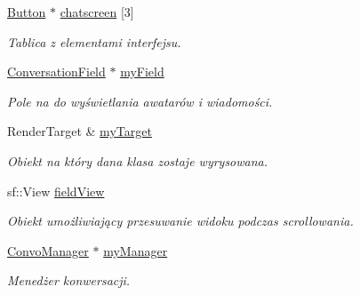 \begin{DoxyCompactItemize}
\item 
\mbox{\label{class_chat_screen_a4a7f9298b854b57eb87b70297a92a90b}} 
\mbox{\hyperlink{class_button}{Button}} $\ast$ \mbox{\hyperlink{class_chat_screen_a4a7f9298b854b57eb87b70297a92a90b}{chatscreen}} \mbox{[}3\mbox{]}
\begin{DoxyCompactList}\small\item\em Tablica z elementami interfejsu. \end{DoxyCompactList}\item 
\mbox{\label{class_chat_screen_ac2cffb6f9f504f93caf42bb356797e58}} 
\mbox{\hyperlink{class_conversation_field}{Conversation\+Field}} $\ast$ \mbox{\hyperlink{class_chat_screen_ac2cffb6f9f504f93caf42bb356797e58}{my\+Field}}
\begin{DoxyCompactList}\small\item\em Pole na do wyświetlania awatarów i wiadomości. \end{DoxyCompactList}\item 
\mbox{\label{class_chat_screen_a26f03e78ce119509e98d1497ae79a43d}} 
Render\+Target \& \mbox{\hyperlink{class_chat_screen_a26f03e78ce119509e98d1497ae79a43d}{my\+Target}}
\begin{DoxyCompactList}\small\item\em Obiekt na który dana klasa zostaje wyrysowana. \end{DoxyCompactList}\item 
\mbox{\label{class_chat_screen_a123598512cc56853567b20ccbb2e93a5}} 
sf\+::\+View \mbox{\hyperlink{class_chat_screen_a123598512cc56853567b20ccbb2e93a5}{field\+View}}
\begin{DoxyCompactList}\small\item\em Obiekt umożliwiający przesuwanie widoku podczas scrollowania. \end{DoxyCompactList}\item 
\mbox{\label{class_chat_screen_a18d2e650a4830577f89d550b55c38712}} 
\mbox{\hyperlink{class_convo_manager}{Convo\+Manager}} $\ast$ \mbox{\hyperlink{class_chat_screen_a18d2e650a4830577f89d550b55c38712}{my\+Manager}}
\begin{DoxyCompactList}\small\item\em Menedżer konwersacji. \end{DoxyCompactList}\item 

\end{DoxyCompactItemize}
